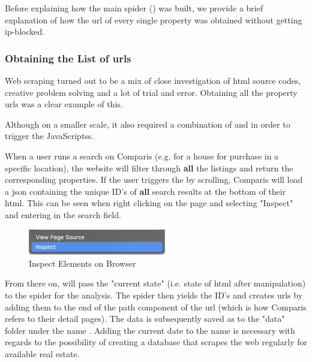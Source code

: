 \documentclass[main]{subfiles}
\begin{document}
Before explaining how the main spider () was built,
we provide a brief explanation of how the \acs*{url} of every single property 
was obtained without getting \acs*{ip}-blocked.

\vspace*{5pt}
\subsubsection{Obtaining the List of \acsp*{url}}
\label{scrape1}
Web scraping turned out to be a mix of close investigation of \acs*{html} source codes, 
creative problem solving and a lot of trial and error. 
Obtaining all the property \acsp*{url} was a clear example of this.

Although on a smaller scale, 
it also required a combination of \pkg[Scrapy] and \pkg[Selenium] in order to trigger the JavaScriptss.

When a user runs a search on Comparis (e.g. for a house for purchase in a specific location), 
the website will filter through \textbf{all} the listings and return the corresponding properties.
If the user triggers the \js by scrolling, Comparis will load a \acs*{json} 
containing the unique ID's of \textbf{all} search results at the bottom of their \acs*{html}.
This can be seen when right clicking on the page and selecting "Inspect" and entering  
in the search field.

\begin{figure}[htbp]
    \centerline{
        \includegraphics[width = 60mm]{prog_3.png}}
    \caption{Inspect Elements on Browser}
    \label{fig:inspectelement}
\end{figure}

From there on, \pkg[Selenium] will pass the "current state" (i.e. state of \acs*{html} after \js manipulation)
to the spider for the analysis.
The spider then yields the ID's and creates \acsp*{url} by adding them to the end of the path component of the \acs*{url}
(which is how Comparis refers to their detail pages).
The data is subsequently saved as \pkg[.csv] to the "data" folder under the name .
Adding the current date to the name is necessary with regards to the possibility 
of creating a database that scrapes the web regularly for available real estate.
\end{document}
